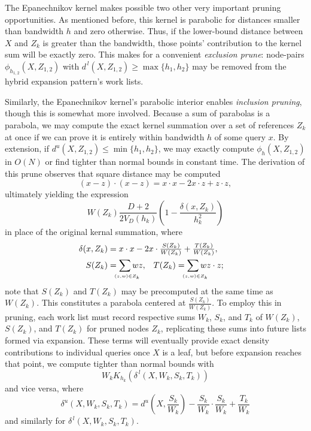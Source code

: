 \documentclass[twoside,leqno,twocolumn]{article}
\newcommand{\lo}[1]{#1^{\,l}}
\newcommand{\hi}[1]{#1^u}
\newcommand{\leftlim}[1]{\lefteqn{\scriptscriptstyle #1}}
\begin{document}
The Epanechnikov kernel makes possible two other very important
pruning opportunities.  As mentioned before, this kernel is parabolic
for distances smaller than bandwidth $h$ and zero otherwise.  Thus, if
the lower-bound distance between $X$ and $Z_k$ is greater than the
bandwidth, those points' contribution to the kernel sum will be
exactly zero.  This makes for a convenient {\em exclusion prune}:
node-pairs $\phi_{h_{1,2}}(X,Z_{1,2})$ with $\lo{d}(X,Z_{1,2}) \geq
\max\{h_1,h_2\}$ may be removed from the hybrid expansion pattern's
work lists.

Similarly, the Epanechnikov kernel's parabolic interior enables {\em
inclusion pruning}, though this is somewhat more involved.  Because a
sum of parabolas is a parabola, we may compute the exact kernel
summation over a set of references $Z_k$ at once if we can prove it is
entirely within bandwidth $h$ of some query $x$.  By extension, if
$\hi{d}(X,Z_{1,2}) \leq \min\{h_1,h_2\}$, we may exactly compute
$\phi_h(X,Z_{1,2})$ in $O(N)$ or find tighter than normal bounds in
constant time.  The derivation of this prune observes that square
distance may be computed
\begin{equation}
  (x - z) \cdot (x - z) = x \cdot x - 2 x \cdot z + z \cdot z ,
\end{equation}
ultimately yielding the expression
\begin{equation}
  W(Z_k) \frac{D + 2}{2 V_D(h_k)} \left( 1 - \frac{\delta(x,Z_k)}{h_k^2} \right)
\end{equation}
in place of the original kernal summation, where
\begin{align}
  \delta(x,Z_k) & = \lefteqn{\textstyle x \cdot x - 2x \cdot \frac{S(Z_k)}{W(Z_k)} + \frac{T(Z_k)}{W(Z_k)} ,} \\
  S(Z_k) & = \sum_{\leftlim{(z,w) \in Z_k}} w z , & T(Z_k) & = \sum_{\leftlim{(z,w) \in Z_k}} w z \cdot z ;
\end{align}
note that $S(Z_k)$ and $T(Z_k)$ may be precomputed at the same time as
$W(Z_k)$.  This constitutes a parabola centered at
$\frac{S(Z_k)}{W(Z_k)}$.  To employ this in pruning, each work list
must record respective sums $W_k$, $S_k$, and $T_k$ of $W(Z_k)$,
$S(Z_k)$, and $T(Z_k)$ for pruned nodes $Z_k$, replicating these sums
into future lists formed via expansion.  These terms will eventually
provide exact density contributions to individual queries once $X$ is
a leaf, but before expansion reaches that point, we compute tighter
than normal bounds with
\begin{equation}
  W_k K_{h_k}(\lo{\delta}(X,W_k,S_k,T_k))
\end{equation}
and vice versa, where
\begin{equation}
  \textstyle \hi{\delta}(X,W_k,S_k,T_k) = \hi{d} \! \left( X,\frac{S_k}{W_k} \right) - \frac{S_k}{W_k} \cdot \frac{S_k}{W_k} + \frac{T_k}{W_k}
\end{equation}
and similarly for $\lo{\delta}(X,W_k,S_k,T_k)$.
\end{document}
